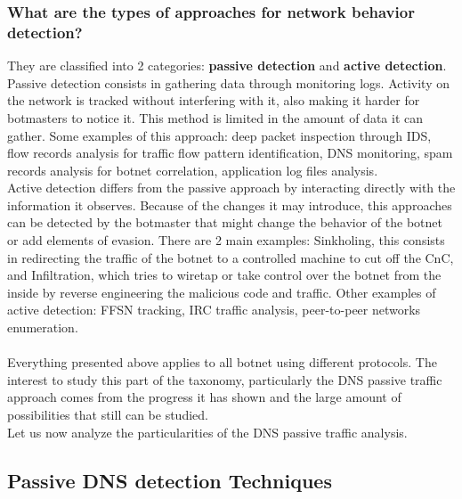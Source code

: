 \subsubsection{What are the types of approaches for network behavior detection?}
They are classified into 2 categories: \textbf{passive detection} and \textbf{active detection}\cite{detection9}. \\
Passive detection consists in gathering data through monitoring logs. Activity on the network is tracked without interfering with it, also making it harder for botmasters to notice it. This method is limited in the amount of data it can gather. Some examples of this approach: deep packet inspection through IDS, flow records analysis for traffic flow pattern identification, DNS monitoring, spam records analysis for botnet correlation, application log files analysis.\\
Active detection differs from the passive approach by interacting directly with the information it observes. Because of the changes it may introduce, this approaches can be detected by the botmaster that might change the behavior of the botnet or add elements of evasion. There are 2 main examples: Sinkholing, this consists in redirecting the traffic of the botnet to a controlled machine to cut off the CnC, and Infiltration, which tries to wiretap or take control over the botnet from the inside by reverse engineering the malicious code and traffic. Other examples of active detection: FFSN tracking, IRC traffic analysis, peer-to-peer networks enumeration.
\\\\
Everything presented above applies to all botnet using different protocols. The interest to study this part of the taxonomy, particularly the DNS passive traffic approach comes from the progress it has shown and the large amount of possibilities that still can be studied.\\
Let us now analyze the particularities of the DNS passive traffic analysis.

\subsection{Passive DNS detection Techniques}
